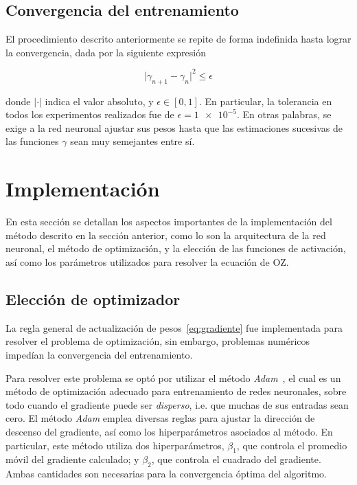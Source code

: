 \subsection{Convergencia del entrenamiento}
El procedimiento descrito anteriormente se repite de forma indefinida hasta lograr la 
convergencia, dada por la siguiente expresión

\begin{equation}
    {\lvert \gamma_{n+1} - \gamma_{n} \rvert}^2 \leq \epsilon
    \label{eq:tolerancia}
\end{equation}

donde $\lvert \cdot \rvert$ indica el valor absoluto, y $\epsilon \in [0, 1]$.
En particular, la tolerancia en todos los experimentos realizados fue de
$\epsilon = \num{1e-5}$.
En otras palabras, se exige a la red neuronal ajustar sus pesos hasta que las estimaciones
sucesivas de las funciones $\gamma$ sean muy semejantes entre sí.

\section{Implementación}
En esta sección se detallan los aspectos importantes de la implementación del método
descrito en la sección anterior, como lo son la arquitectura de la red neuronal, el método
de optimización, y la elección de las funciones de activación, así como los parámetros
utilizados para resolver la ecuación de OZ.

\subsection{Elección de optimizador}
La regla general de actualización de pesos~\eqref{eq:gradiente} fue implementada para 
resolver el problema de optimización, sin embargo, problemas numéricos impedían la
convergencia del entrenamiento.

Para resolver este problema se optó por utilizar el método \emph{Adam}~\cite{kingmaAdamMethodStochastic2017},
el cual es un método de optimización adecuado para entrenamiento de redes neuronales,
sobre todo cuando el gradiente puede ser \emph{disperso}, i.e. que muchas de sus entradas
sean cero.
El método \emph{Adam} emplea diversas reglas para ajustar la dirección de descenso del
gradiente, así como los hiperparámetros asociados al método. En particular, este método
utiliza dos hiperparámetros, $\beta_1$, que controla el promedio móvil
del gradiente calculado; y $\beta_2$, que controla el cuadrado del gradiente. Ambas
cantidades son necesarias para la convergencia óptima del algoritmo.

